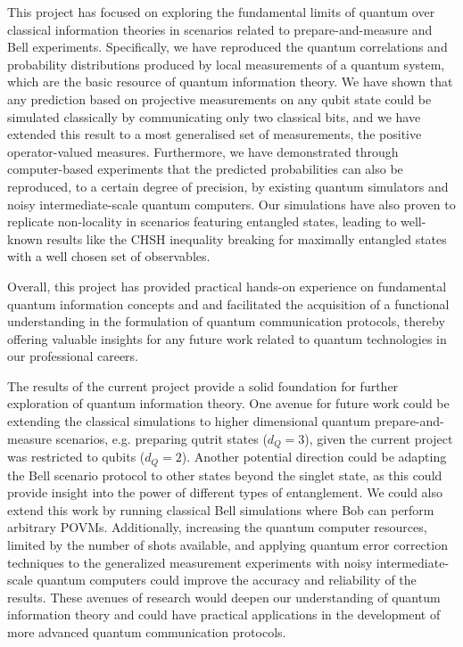 This project has focused on exploring the fundamental limits of quantum over classical information theories in scenarios related to prepare-and-measure and Bell experiments. Specifically, we have reproduced the quantum correlations and probability distributions produced by local measurements of a quantum system, which are the basic resource of quantum information theory. We have shown that any prediction based on projective measurements on any qubit state could be simulated classically by communicating only two classical bits, and we have extended this result to a most generalised set of measurements, the positive operator-valued measures. Furthermore, we have demonstrated through computer-based experiments that the predicted probabilities can also be reproduced, to a certain degree of precision, by existing quantum simulators and noisy intermediate-scale quantum computers. Our simulations have also proven to replicate non-locality in scenarios featuring entangled states, leading to well-known results like the CHSH inequality breaking for maximally entangled states with a well chosen set of observables. 

Overall, this project has provided practical hands-on experience on fundamental quantum information concepts and and facilitated the acquisition of a functional understanding in the formulation of quantum communication protocols, thereby offering valuable insights for any future work related to quantum technologies in our professional careers.


The results of the current project provide a solid foundation for further exploration of quantum information theory. One avenue for future work could be extending the classical simulations to higher dimensional quantum prepare-and-measure scenarios, e.g. preparing qutrit states ($d_Q = 3$), given the current project was restricted to qubits ($d_Q = 2$). Another potential direction could be adapting the Bell scenario protocol to other states beyond the singlet state, as this could provide insight into the power of different types of entanglement. We could also extend this work by running classical Bell simulations where Bob can perform arbitrary POVMs. Additionally, increasing the quantum computer resources, limited by the number of shots available, and applying quantum error correction techniques to the generalized measurement experiments with noisy intermediate-scale quantum computers could improve the accuracy and reliability of the results. These avenues of research would deepen our understanding of quantum information theory and could have practical applications in the development of more advanced quantum communication protocols.
